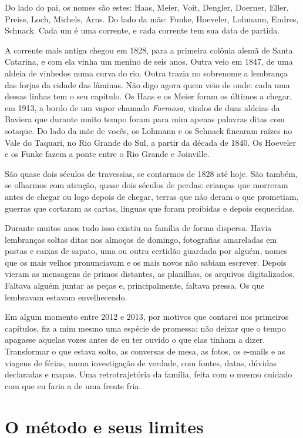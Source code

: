 \documentclass[
  brazilian,
  11pt,
  openany]{book}
\begin{document}
Do lado do pai, os nomes são estes: Haas, Meier, Voit, Dengler, Doerner,
Eller, Preiss, Loch, Michels, Arns. Do lado da mãe: Funke, Hoeveler,
Lohmann, Endres, Schnack. Cada um é uma corrente, e cada corrente tem
sua data de partida.

A corrente mais antiga chegou em 1828, para a primeira colônia alemã de
Santa Catarina, e com ela vinha um menino de seis anos. Outra veio em
1847, de uma aldeia de vinhedos numa curva do rio. Outra trazia no
sobrenome a lembrança das forjas da cidade das lâminas. Não digo agora
quem veio de onde: cada uma dessas linhas tem o seu capítulo. Os Haas e
os Meier foram os últimos a chegar, em 1913, a bordo de um vapor chamado
\emph{Formosa}, vindos de duas aldeias da Baviera que durante muito
tempo foram para mim apenas palavras ditas com sotaque. Do lado da mãe
de vocês, os Lohmann e os Schnack fincaram raízes no Vale do Taquari, no
Rio Grande do Sul, a partir da década de 1840. Os Hoeveler e os Funke
fazem a ponte entre o Rio Grande e Joinville.

São quase dois séculos de travessias, se contarmos de 1828 até hoje. São
também, se olharmos com atenção, quase dois séculos de perdas: crianças
que morreram antes de chegar ou logo depois de chegar, terras que não
deram o que prometiam, guerras que cortaram as cartas, línguas que foram
proibidas e depois esquecidas.

Durante muitos anos tudo isso existiu na família de forma dispersa.
Havia lembranças soltas ditas nos almoços de domingo, fotografias
amareladas em pastas e caixas de sapato, uma ou outra certidão guardada
por alguém, nomes que os mais velhos pronunciavam e os mais novos não
sabiam escrever. Depois vieram as mensagens de primos distantes, as
planilhas, os arquivos digitalizados. Faltava alguém juntar as peças e,
principalmente, faltava pressa. Os que lembravam estavam envelhecendo.

Em algum momento entre 2012 e 2013, por motivos que contarei nos
primeiros capítulos, fiz a mim mesmo uma espécie de promessa: não deixar
que o tempo apagasse aquelas vozes antes de eu ter ouvido o que elas
tinham a dizer. Transformar o que estava solto, as conversas de mesa, as
fotos, os e-mails e as viagens de férias, numa investigação de verdade,
com fontes, datas, dúvidas declaradas e mapas. Uma retrotrajetória da
família, feita com o mesmo cuidado com que eu faria a de uma frente
fria.

\section{O método e seus limites}\label{o-muxe9todo-e-seus-limites}
\end{document}
